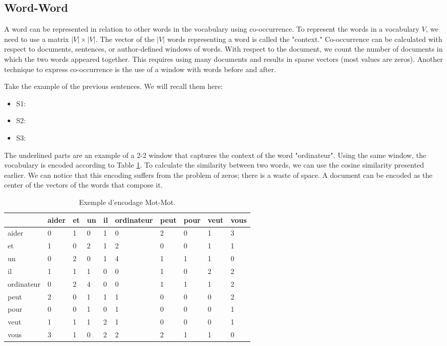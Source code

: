 \documentclass{KBook}
\begin{document}
\subsection{Word-Word}

A word can be represented in relation to other words in the vocabulary using co-occurrence. 
To represent the words in a vocabulary $ V $, we need to use a matrix $|V| \times |V|$. 
The vector of the $|V|$ words representing a word is called the "context."
Co-occurrence can be calculated with respect to documents, sentences, or author-defined windows of words. 
With respect to the document, we count the number of documents in which the two words appeared together. 
This requires using many documents and results in sparse vectors (most values are zeros).
Another technique to express co-occurrence is the use of a window with words before and after.

Take the example of the previous sentences. 
We will recall them here:
\begin{itemize}
	\item S1: 
	\item S2: 
	\item S3: 
\end{itemize}
The underlined parts are an example of a 2-2 window that captures the context of the word "ordinateur". 
Using the same window, the vocabulary is encoded according to Table \ref{tab:catmot-mot}. 
To calculate the similarity between two words, we can use the cosine similarity presented earlier.
We can notice that this encoding suffers from the problem of zeros; there is a waste of space.
A document can be encoded as the center of the vectors of the words that compose it.
\begin{table}[ht]
\centering
\begin{tabular}{llllllllll}
	\hline\hline
	& aider & et & un & il & ordinateur & peut & pour & veut & vous \\
	\hline
	aider & 0 & 1 & 0 & 1 & 0 & 2 & 0 & 1 & 3 \\
	et & 1 & 0 & 2 & 1 & 2 & 0 & 0 & 1 & 1 \\
	un & 0 & 2 & 0 & 1 & 4 & 1 & 1 & 1 & 0 \\
	il & 1 & 1 & 1 & 0 & 0 & 1 & 0 & 2 & 2 \\
	ordinateur & 0 & 2 & 4 & 0 & 0 & 1 & 1 & 1 & 2 \\
	peut & 2 & 0 & 1 & 1 & 1 & 0 & 0 & 0 & 2 \\
	pour & 0 & 0 & 1 & 0 & 1 & 0 & 0 & 0 & 1 \\
	veut & 1 & 1 & 1 & 2 & 1 & 0 & 0 & 0 & 1 \\
	vous & 3 & 1 & 0 & 2 & 2 & 2 & 1 & 1 & 0 \\
	\hline\hline
\end{tabular}
\caption{Exemple d'encodage Mot-Mot.}
\label{tab:catmot-mot}
\end{table}
\end{document}
